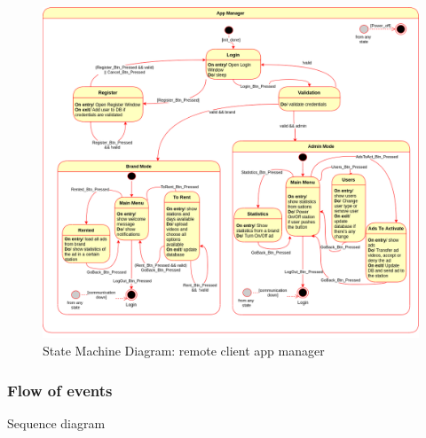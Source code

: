 %
\begin{figure}[htb!]
\centering
    \includegraphics[width=0.9\columnwidth]{./img/state-mach-rc-app-manag.png}
  \caption{State Machine Diagram: remote client app manager}%
\label{fig:state-mach-rc-app-manag}
\end{figure}
%
%
%

\subsubsection{Flow of events}
\label{sec:flow-events-1}
Sequence diagram

